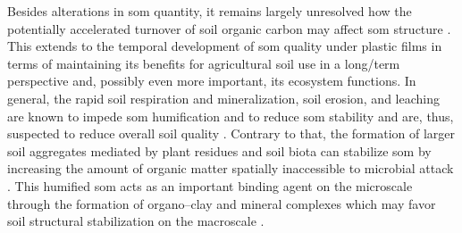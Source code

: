 Besides alterations in \ac{som} quantity, it remains largely unresolved how the potentially accelerated turnover of soil organic carbon may affect \ac{som} structure \citep{DiaconoLongterm2010}. This extends to the temporal development of \ac{som} quality under plastic films in terms of maintaining its benefits for agricultural soil use in a long\-/term perspective \citep{DoranDefining1994} and, possibly even more important, its ecosystem functions. In general, the rapid soil respiration and mineralization, soil erosion, and leaching \citep{BolanDissolved2011} are known to impede \ac{som} humification and to reduce \ac{som} stability \citep{SollinsStabilization1996} and are, thus, suspected to reduce overall soil quality \citep{LalChallenges2009}. Contrary to that, the formation of larger soil aggregates mediated by plant residues and soil biota can stabilize \ac{som} by increasing the amount of organic matter spatially inaccessible to microbial attack \citep{SollinsStabilization1996,vonLutzowStabilization2006}. This humified \ac{som} acts as an important binding agent on the microscale through the formation of organo--clay and mineral complexes which may favor soil structural stabilization on the macroscale \citep{BronickSoil2005,ZhangEffects2015}.

